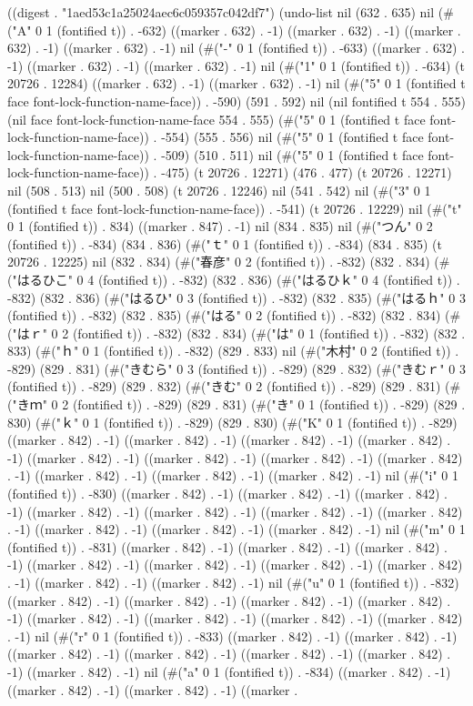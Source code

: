 
((digest . "1aed53c1a25024aec6c059357c042df7") (undo-list nil (632 . 635) nil (#("A" 0 1 (fontified t)) . -632) ((marker . 632) . -1) ((marker . 632) . -1) ((marker . 632) . -1) ((marker . 632) . -1) nil (#("-" 0 1 (fontified t)) . -633) ((marker . 632) . -1) ((marker . 632) . -1) ((marker . 632) . -1) nil (#("1" 0 1 (fontified t)) . -634) (t 20726 . 12284) ((marker . 632) . -1) ((marker . 632) . -1) nil (#("5" 0 1 (fontified t face font-lock-function-name-face)) . -590) (591 . 592) nil (nil fontified t 554 . 555) (nil face font-lock-function-name-face 554 . 555) (#("5" 0 1 (fontified t face font-lock-function-name-face)) . -554) (555 . 556) nil (#("5" 0 1 (fontified t face font-lock-function-name-face)) . -509) (510 . 511) nil (#("5" 0 1 (fontified t face font-lock-function-name-face)) . -475) (t 20726 . 12271) (476 . 477) (t 20726 . 12271) nil (508 . 513) nil (500 . 508) (t 20726 . 12246) nil (541 . 542) nil (#("3" 0 1 (fontified t face font-lock-function-name-face)) . -541) (t 20726 . 12229) nil (#("t" 0 1 (fontified t)) . 834) ((marker . 847) . -1) nil (834 . 835) nil (#("つん" 0 2 (fontified t)) . -834) (834 . 836) (#("ｔ" 0 1 (fontified t)) . -834) (834 . 835) (t 20726 . 12225) nil (832 . 834) (#("春彦" 0 2 (fontified t)) . -832) (832 . 834) (#("はるひこ" 0 4 (fontified t)) . -832) (832 . 836) (#("はるひｋ" 0 4 (fontified t)) . -832) (832 . 836) (#("はるひ" 0 3 (fontified t)) . -832) (832 . 835) (#("はるｈ" 0 3 (fontified t)) . -832) (832 . 835) (#("はる" 0 2 (fontified t)) . -832) (832 . 834) (#("はｒ" 0 2 (fontified t)) . -832) (832 . 834) (#("は" 0 1 (fontified t)) . -832) (832 . 833) (#("ｈ" 0 1 (fontified t)) . -832) (829 . 833) nil (#("木村" 0 2 (fontified t)) . -829) (829 . 831) (#("きむら" 0 3 (fontified t)) . -829) (829 . 832) (#("きむｒ" 0 3 (fontified t)) . -829) (829 . 832) (#("きむ" 0 2 (fontified t)) . -829) (829 . 831) (#("きｍ" 0 2 (fontified t)) . -829) (829 . 831) (#("き" 0 1 (fontified t)) . -829) (829 . 830) (#("ｋ" 0 1 (fontified t)) . -829) (829 . 830) (#("K" 0 1 (fontified t)) . -829) ((marker . 842) . -1) ((marker . 842) . -1) ((marker . 842) . -1) ((marker . 842) . -1) ((marker . 842) . -1) ((marker . 842) . -1) ((marker . 842) . -1) ((marker . 842) . -1) ((marker . 842) . -1) ((marker . 842) . -1) ((marker . 842) . -1) nil (#("i" 0 1 (fontified t)) . -830) ((marker . 842) . -1) ((marker . 842) . -1) ((marker . 842) . -1) ((marker . 842) . -1) ((marker . 842) . -1) ((marker . 842) . -1) ((marker . 842) . -1) ((marker . 842) . -1) ((marker . 842) . -1) ((marker . 842) . -1) nil (#("m" 0 1 (fontified t)) . -831) ((marker . 842) . -1) ((marker . 842) . -1) ((marker . 842) . -1) ((marker . 842) . -1) ((marker . 842) . -1) ((marker . 842) . -1) ((marker . 842) . -1) ((marker . 842) . -1) ((marker . 842) . -1) nil (#("u" 0 1 (fontified t)) . -832) ((marker . 842) . -1) ((marker . 842) . -1) ((marker . 842) . -1) ((marker . 842) . -1) ((marker . 842) . -1) ((marker . 842) . -1) ((marker . 842) . -1) ((marker . 842) . -1) nil (#("r" 0 1 (fontified t)) . -833) ((marker . 842) . -1) ((marker . 842) . -1) ((marker . 842) . -1) ((marker . 842) . -1) ((marker . 842) . -1) ((marker . 842) . -1) ((marker . 842) . -1) nil (#("a" 0 1 (fontified t)) . -834) ((marker . 842) . -1) ((marker . 842) . -1) ((marker . 842) . -1) ((marker . 